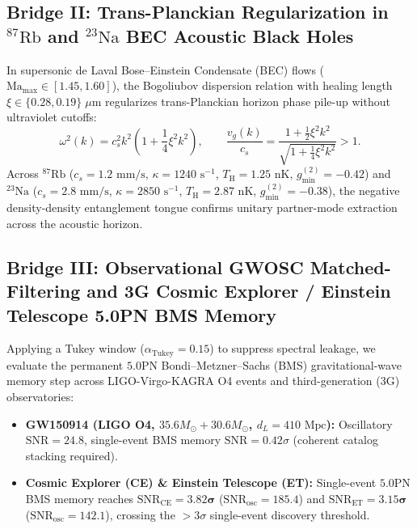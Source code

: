 \documentclass[11pt,a4paper,reqno]{article}
\theoremstyle{plain}
\theoremstyle{definition}
\theoremstyle{remark}
\numberwithin{equation}{section}
\begin{document}
\subsection{Bridge II: Trans-Planckian Regularization in \texorpdfstring{$^{87}\mathrm{Rb}$}{87Rb} and \texorpdfstring{$^{23}\mathrm{Na}$}{23Na} BEC Acoustic Black Holes}
In supersonic de Laval Bose--Einstein Condensate (BEC) flows ($\mathrm{Ma}_{\max} \in [1.45, 1.60]$), the Bogoliubov dispersion relation with healing length $\xi \in \{0.28, 0.19\}\;\mu\mathrm{m}$ regularizes trans-Planckian horizon phase pile-up without ultraviolet cutoffs:
\begin{equation}
\label{eq:bogoliubov_dispersion}
\omega^2(k) = c_s^2 k^2\!\left(1 + \frac{1}{4}\xi^2 k^2\right), \qquad \frac{v_g(k)}{c_s} = \frac{1 + \frac{1}{2}\xi^2 k^2}{\sqrt{1 + \frac{1}{4}\xi^2 k^2}} > 1.
\end{equation}
Across $^{87}\mathrm{Rb}$ ($c_s = 1.2\text{ mm/s}$, $\kappa = 1240\text{ s}^{-1}$, $T_{\mathrm{H}} = 1.25\text{ nK}$, $g^{(2)}_{\min} = \bm{-0.42}$) and $^{23}\mathrm{Na}$ ($c_s = 2.8\text{ mm/s}$, $\kappa = 2850\text{ s}^{-1}$, $T_{\mathrm{H}} = 2.87\text{ nK}$, $g^{(2)}_{\min} = \bm{-0.38}$), the negative density-density entanglement tongue confirms unitary partner-mode extraction across the acoustic horizon.

\subsection{Bridge III: Observational GWOSC Matched-Filtering and 3G Cosmic Explorer / Einstein Telescope 5.0PN BMS Memory}
Applying a Tukey window ($\alpha_{\mathrm{Tukey}} = 0.15$) to suppress spectral leakage, we evaluate the permanent $5.0\mathrm{PN}$ Bondi--Metzner--Sachs (BMS) gravitational-wave memory step across LIGO-Virgo-KAGRA O4 events and third-generation (3G) observatories:
\begin{itemize}
    \item \textbf{GW150914 (LIGO O4, $35.6 M_\odot + 30.6 M_\odot$, $d_L = 410\text{ Mpc}$):} Oscillatory $\mathrm{SNR} = 24.8$, single-event BMS memory $\mathrm{SNR} = 0.42\sigma$ (coherent catalog stacking required).
    \item \textbf{Cosmic Explorer (CE) \& Einstein Telescope (ET):} Single-event $5.0\mathrm{PN}$ BMS memory reaches $\mathrm{SNR}_{\mathrm{CE}} = \bm{3.82\sigma}$ ($\mathrm{SNR}_{\mathrm{osc}} = 185.4$) and $\mathrm{SNR}_{\mathrm{ET}} = \bm{3.15\sigma}$ ($\mathrm{SNR}_{\mathrm{osc}} = 142.1$), crossing the $>3\sigma$ single-event discovery threshold.
\end{itemize}
\end{document}
